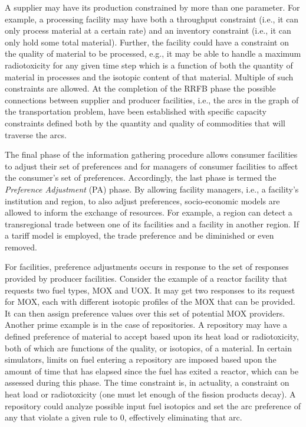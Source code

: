 A supplier may have its production constrained by more than one parameter. For
example, a processing facility may have both a throughput constraint (i.e., it
can only process material at a certain rate) and an inventory constraint (i.e.,
it can only hold some total material). Further, the facility could have a
constraint on the quality of material to be processed, e.g., it may be able to
handle a maximum radiotoxicity for any given time step which is a function of
both the quantity of material in processes and the isotopic content of that
material. Multiple of such constraints are allowed. At the completion of the
RRFB phase the possible connections between supplier and producer facilities,
i.e., the arcs in the graph of the transportation problem, have been established
with specific capacity constraints defined both by the quantity and quality of
commodities that will traverse the arcs.

The final phase of the information gathering procedure allows consumer
facilities to adjust their set of preferences and for managers of consumer
facilities to affect the consumer's set of preferences. Accordingly, the last
phase is termed the \textit{Preference Adjustment} (PA) phase. By allowing
facility managers, i.e., a facility's institution and region, to also adjust
preferences, socio-economic models are allowed to inform the exchange of
resources. For example, a region can detect a transregional trade between one of
its facilities and a facility in another region. If a tariff model is employed,
the trade preference and be diminished or even removed.

For facilities, preference adjustments occurs in response to the set of
responses provided by producer facilities. Consider the example of a reactor
facility that requests two fuel types, MOX and UOX. It may get two responses to
its request for MOX, each with different isotopic profiles of the MOX that can
be provided. It can then assign preference values over this set of potential MOX
providers. Another prime example is in the case of repositories. A repository
may have a defined preference of material to accept based upon its heat load or
radiotoxicity, both of which are functions of the quality, or isotopics, of a
material. In certain simulators, limits on fuel entering a repository are
imposed based upon the amount of time that has elapsed since the fuel has exited
a reactor, which can be assessed during this phase. The time constraint is, in
actuality, a constraint on heat load or radiotoxicity (one must let enough of
the fission products decay). A repository could analyze possible input fuel
isotopics and set the arc preference of any that violate a given rule to 0,
effectively eliminating that arc.

